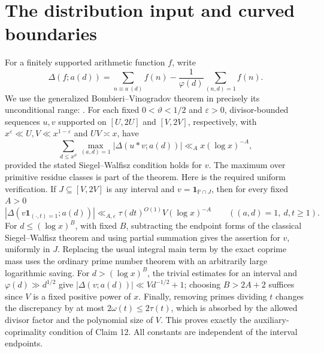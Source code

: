 \documentclass[11pt]{article}
\newcommand{\PP}{\mathbb P}
\newcommand{\one}{\mathbf 1}
\newcommand{\eps}{\varepsilon}
\begin{document}
\section{The distribution input and curved boundaries}
For a finitely supported arithmetic function $f$, write
\[
 \Delta(f;a(d))=\sum_{n\equiv a\ (d)}f(n)
       -\frac1{\varphi(d)}\sum_{(n,d)=1}f(n).
\]
We use the generalized Bombieri--Vinogradov theorem in precisely its
unconditional range: \cite[Claim 12 and Theorem 14]{Polymath2014}.
For each fixed $0<\vartheta<1/2$ and $\eps>0$, divisor-bounded sequences
$u,v$ supported on $[U,2U]$ and $[V,2V]$, respectively, with
$x^\eps\ll U,V\ll x^{1-\eps}$ and $UV\asymp x$, have
\begin{equation}\label{eq:geh}
 \sum_{d\le x^\vartheta}\max_{(a,d)=1}
 |\Delta(u*v;a(d))|\ll_A x(\log x)^{-A},
\end{equation}
provided the stated Siegel--Walfisz condition holds for $v$.
The maximum over primitive residue classes is part of the theorem.
Here is the required uniform verification. If $J\subseteq[V,2V]$ is
any interval and $v=\one_{\PP\cap J}$, then for every fixed $A>0$
\[
 |\Delta(v\one_{(\cdot,t)=1};a(d))|
 \ll_{A,\eps}\tau(dt)^{O(1)}V(\log x)^{-A}
 \qquad ((a,d)=1,\ d,t\ge1).
\]
For $d\le(\log x)^B$, with fixed $B$, subtracting the endpoint forms
of the classical Siegel--Walfisz theorem and using partial summation
gives the assertion for $v$, uniformly in $J$. Replacing the usual
integral main term by the exact coprime mass uses the ordinary prime
number theorem with an arbitrarily large logarithmic saving.
For $d>(\log x)^B$, the trivial estimates for an interval and
$\varphi(d)\gg d^{1/2}$ give
$|\Delta(v;a(d))|\ll Vd^{-1/2}+1$; choosing $B>2A+2$
suffices since $V$ is a fixed positive power of $x$.
Finally, removing primes dividing $t$ changes the discrepancy by at
most $2\omega(t)\le2\tau(t)$, which is absorbed by the allowed
divisor factor and the polynomial size of $V$. This proves exactly
the auxiliary-coprimality condition of Claim 12. All constants are
independent of the interval endpoints.
\end{document}
